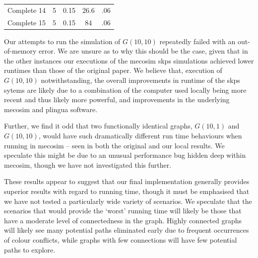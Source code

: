 \begin{table}
\begin{tabular}{@{}lcccc@{}}
Complete 14 & 5                                                            & 0.15                                                           & 26.6 & .06                                                       \\
Complete 15 & 5                                                            & 0.15                                                           & 84   & .06                                                       \\ \bottomrule
\end{tabular}%
\end{table}

Our attempts to run the simulation of \(G(10,10)\) repeatedly failed with an out-of-memory error.  We are unsure as to why this should be the case, given that in the other instances our executions of the \gls{mecosim} \gls{skps} simulations achieved lower runtimes than those of the original paper.  We believe that, execution of \(G(10,10)\) notwithstanding, the overall improvements in runtime of the \gls{skps} sytems are likely due to a combination of the computer used locally being more recent and thus likely more powerful, and improvements in the underlying \gls{mecosim} and \gls{plingua} software.

Further, we find it odd that two functionally identical graphs, \(G(10,1)\) and \(G(10,10)\), would have such dramatically different run time behaviours when running in \gls{mecosim} -- seen in both the original and our local results.  We speculate this might be due to an unusual performance bug hidden deep within \gls{mecosim}, though we have not investigated this further.

These results appear to suggest that our final implementation generally provides superior results with regard to running time, though it must be emphasised that we have not tested a particularly wide variety of scenarios.  We speculate that the scenarios that would provide the `worst' running time will likely be those that have a moderate level of connectedness in the graph.  Highly connected graphs will likely see many potential paths eliminated early due to frequent occurrences of colour conflicts, while graphs with few connections will have few potential paths to explore.

